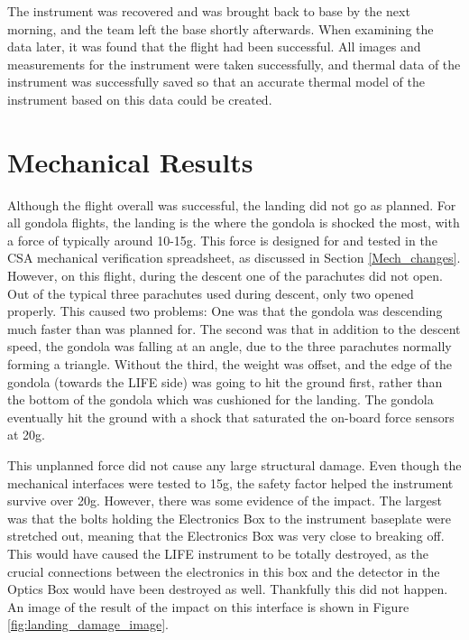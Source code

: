 The instrument was recovered and was brought back to base by the next morning, and the team left the base shortly afterwards. When examining the data later, it was found that the flight had been successful. All images and measurements for the instrument were taken successfully, and thermal data of the instrument was successfully saved so that an accurate thermal model of the instrument based on this data could be created.

\section{Mechanical Results}
Although the flight overall was successful, the landing did not go as planned. For all gondola flights, the landing is the where the gondola is shocked the most, with a force of typically around 10-15g. This force is designed for and tested in the CSA mechanical verification spreadsheet, as discussed in Section \ref{Mech_changes}. However, on this flight, during the descent one of the parachutes did not open. Out of the typical three parachutes used during descent, only two opened properly. This caused two problems: One was that the gondola was descending much faster than was planned for. The second was that in addition to the descent speed, the gondola was falling at an angle, due to the three parachutes normally forming a triangle. Without the third, the weight was offset, and the edge of the gondola (towards the LIFE side) was going to hit the ground first, rather than the bottom of the gondola which was cushioned for the landing. The gondola eventually hit the ground with a shock that saturated the on-board force sensors at 20g.

This unplanned force did not cause any large structural damage. Even though the mechanical interfaces were tested to 15g, the safety factor helped the instrument survive over 20g. However, there was some evidence of the impact. The largest was that the bolts holding the Electronics Box to the instrument baseplate were stretched out, meaning that the Electronics Box was very close to breaking off. This would have caused the LIFE instrument to be totally destroyed, as the crucial connections between the electronics in this box and the detector in the Optics Box would have been destroyed as well. Thankfully this did not happen. An image of the result of the impact on this interface is shown in Figure \ref{fig:landing_damage_image}.

